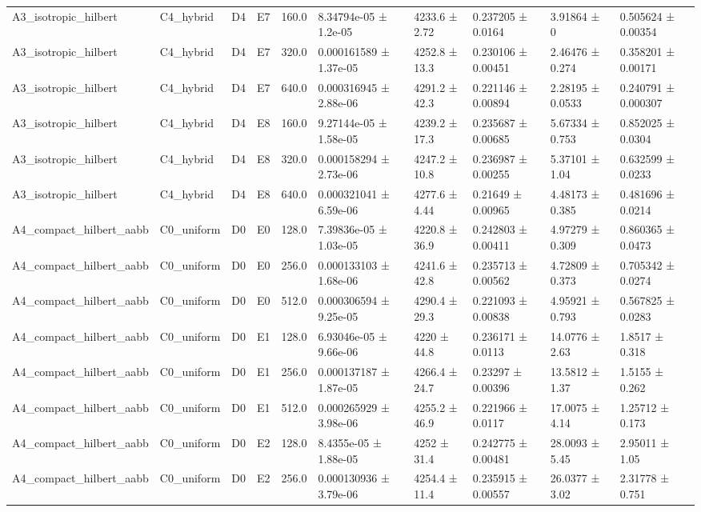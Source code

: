 \begin{table}
\begin{tabular}{llllllllll}
A3\_isotropic\_hilbert & C4\_hybrid & D4 & E7 & 160.0 & 8.34794e-05 ± 1.2e-05 & 4233.6 ± 2.72 & 0.237205 ± 0.0164 & 3.91864 ± 0 & 0.505624 ± 0.00354 \\
A3\_isotropic\_hilbert & C4\_hybrid & D4 & E7 & 320.0 & 0.000161589 ± 1.37e-05 & 4252.8 ± 13.3 & 0.230106 ± 0.00451 & 2.46476 ± 0.274 & 0.358201 ± 0.00171 \\
A3\_isotropic\_hilbert & C4\_hybrid & D4 & E7 & 640.0 & 0.000316945 ± 2.88e-06 & 4291.2 ± 42.3 & 0.221146 ± 0.00894 & 2.28195 ± 0.0533 & 0.240791 ± 0.000307 \\
A3\_isotropic\_hilbert & C4\_hybrid & D4 & E8 & 160.0 & 9.27144e-05 ± 1.58e-05 & 4239.2 ± 17.3 & 0.235687 ± 0.00685 & 5.67334 ± 0.753 & 0.852025 ± 0.0304 \\
A3\_isotropic\_hilbert & C4\_hybrid & D4 & E8 & 320.0 & 0.000158294 ± 2.73e-06 & 4247.2 ± 10.8 & 0.236987 ± 0.00255 & 5.37101 ± 1.04 & 0.632599 ± 0.0233 \\
A3\_isotropic\_hilbert & C4\_hybrid & D4 & E8 & 640.0 & 0.000321041 ± 6.59e-06 & 4277.6 ± 4.44 & 0.21649 ± 0.00965 & 4.48173 ± 0.385 & 0.481696 ± 0.0214 \\
A4\_compact\_hilbert\_aabb & C0\_uniform & D0 & E0 & 128.0 & 7.39836e-05 ± 1.03e-05 & 4220.8 ± 36.9 & 0.242803 ± 0.00411 & 4.97279 ± 0.309 & 0.860365 ± 0.0473 \\
A4\_compact\_hilbert\_aabb & C0\_uniform & D0 & E0 & 256.0 & 0.000133103 ± 1.68e-06 & 4241.6 ± 42.8 & 0.235713 ± 0.00562 & 4.72809 ± 0.373 & 0.705342 ± 0.0274 \\
A4\_compact\_hilbert\_aabb & C0\_uniform & D0 & E0 & 512.0 & 0.000306594 ± 9.25e-05 & 4290.4 ± 29.3 & 0.221093 ± 0.00838 & 4.95921 ± 0.793 & 0.567825 ± 0.0283 \\
A4\_compact\_hilbert\_aabb & C0\_uniform & D0 & E1 & 128.0 & 6.93046e-05 ± 9.66e-06 & 4220 ± 44.8 & 0.236171 ± 0.0113 & 14.0776 ± 2.63 & 1.8517 ± 0.318 \\
A4\_compact\_hilbert\_aabb & C0\_uniform & D0 & E1 & 256.0 & 0.000137187 ± 1.87e-05 & 4266.4 ± 24.7 & 0.23297 ± 0.00396 & 13.5812 ± 1.37 & 1.5155 ± 0.262 \\
A4\_compact\_hilbert\_aabb & C0\_uniform & D0 & E1 & 512.0 & 0.000265929 ± 3.98e-06 & 4255.2 ± 46.9 & 0.221966 ± 0.0117 & 17.0075 ± 4.14 & 1.25712 ± 0.173 \\
A4\_compact\_hilbert\_aabb & C0\_uniform & D0 & E2 & 128.0 & 8.4355e-05 ± 1.88e-05 & 4252 ± 31.4 & 0.242775 ± 0.00481 & 28.0093 ± 5.45 & 2.95011 ± 1.05 \\
A4\_compact\_hilbert\_aabb & C0\_uniform & D0 & E2 & 256.0 & 0.000130936 ± 3.79e-06 & 4254.4 ± 11.4 & 0.235915 ± 0.00557 & 26.0377 ± 3.02 & 2.31778 ± 0.751 \\

\end{tabular}
\end{table}
